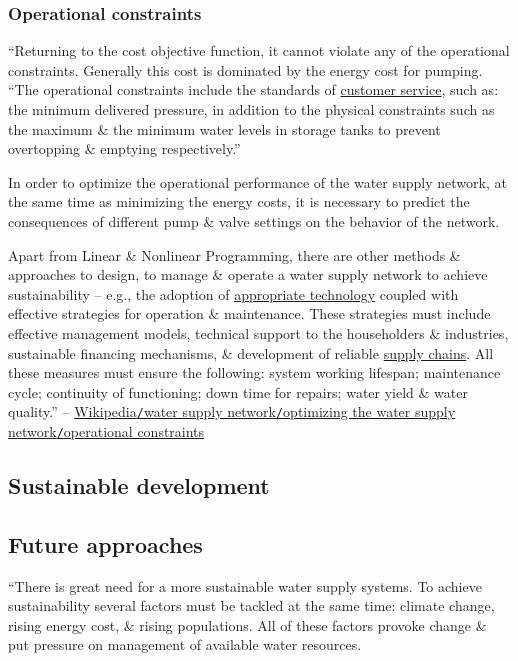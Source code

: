 \documentclass[oneside]{book}
\numberwithin{equation}{section}
\begin{document}
\subsubsection{Operational constraints}
``Returning to the cost objective function, it cannot violate any of the operational constraints. Generally this cost is dominated by the energy cost for pumping. ``The operational constraints include the standards of \href{https://en.wikipedia.org/wiki/Customer_service}{customer service}, such as: the minimum delivered pressure, in addition to the physical constraints such as the maximum \& the minimum water levels in storage tanks to prevent overtopping \& emptying respectively.''

In order to optimize the operational performance of the water supply network, at the same time as minimizing the energy costs, it is necessary to predict the consequences of different pump \& valve settings on the behavior of the network.

Apart from Linear \& Nonlinear Programming, there are other methods \& approaches to design, to manage \& operate a water supply network to achieve sustainability -- e.g., the adoption of \href{https://en.wikipedia.org/wiki/Appropriate_technology}{appropriate technology} coupled with effective strategies for operation \& maintenance. These strategies must include effective management models, technical support to the householders \& industries, sustainable financing mechanisms, \& development of reliable \href{https://en.wikipedia.org/wiki/Supply_chain}{supply chains}. All these measures must ensure the following: system working lifespan; maintenance cycle; continuity of functioning; down time for repairs; water yield \& water quality.'' -- \href{https://en.wikipedia.org/wiki/Water_supply_network#Operational_constraints}{Wikipedia\texttt{/}water supply network\texttt{/}optimizing the water supply network\texttt{/}operational constraints}

\subsection{Sustainable development}

\subsection{Future approaches}
``There is great need for a more sustainable water supply systems. To achieve sustainability several factors must be tackled at the same time: climate change, rising energy cost, \& rising populations. All of these factors provoke change \& put pressure on management of available water resources.
\end{document}
